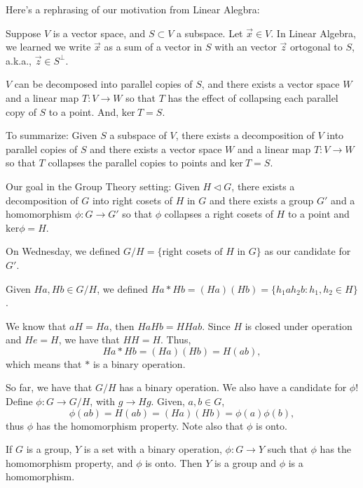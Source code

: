 
Here's a rephrasing of our motivation from Linear Alegbra:

Suppose $V$ is a vector space, and $S \subset V$ a subspace. Let $\vec{x} \in V$. In Linear Algebra, we learned we write $\vec{x}$ as a sum of a vector in $S$ with an vector $\vec{z}$ ortogonal to $S$, a.k.a., $\vec{z} \in S^\perp$. 

$V$ can be decomposed into parallel copies of $S$, and there exists a vector space $W$ and a linear map $T: V \to W$ so that  $T$ has the effect of collapsing each parallel copy of $S$ to a point. And, $\mathrm{ker}\ T = S$.

To summarize: Given $S$ a subspace of $V$, there exists a decomposition of  $V$ into parallel copies of $S$ and there exists a vector space $W$ and a linear map $T : V \to W$ so that  $T$ collapses the parallel copies to points and $\mathrm{ker}\ T = S$.

Our goal in the Group Theory setting: Given  $H \vartriangleleft G$, there exists a decomposition of  $G$ into right cosets of $H$ in $G$ and there exists a group $G'$ and a homomorphism $\phi: G \to G'$ so that $\phi$ collapses a right cosets of $H$ to a point and  $\mathrm{ker} \phi = H$.

On Wednesday, we defined $G/H = \{\text{right cosets of $H$ in $G$}\}$ as our candidate for $G'$.

Given  $Ha, Hb \in G/H$, we defined  $Ha * Hb = (Ha)(Hb) = \{h_1ah_2b : h_1, h_2 \in H\}$.

We know that $aH = Ha$, then $HaHb = HHab$. Since $H$ is closed under operation and $He = H$, we have that $HH = H$. Thus, \[Ha * Hb = (Ha)(Hb) = H(ab),\]
which means that $*$ is a binary operation. 

So far, we have that $G/H$ has a binary operation. We also have a candidate for  $\phi$! Define $\phi: G \to G/H$, with  $g \to Hg$. Given,  $a, b \in G$, \[\phi(ab) = H(ab) = (Ha)(Hb) = \phi(a)\phi(b), \] thus $\phi$ has the homomorphism property. Note also that $\phi$ is onto.

\begin{lem}
	If $G$ is a group, $Y$ is a set with a binary operation, $\phi : G \to Y$ such that $\phi$ has the homomorphism property, and $\phi$ is onto. Then $Y$ is a group and $\phi$ is a homomorphism.
\end{lem}

